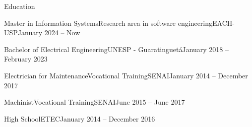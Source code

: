 \documentclass[]{template}
\begin{document}
\resumeheader
{}
{}
{}
{}
{}

\vspace*{1mm}

\begin{section}{Education}
 \begin{subsectionnobullet}{Master in Information Systems}{Research area in software engineering}{EACH-USP}{January 2024 -- Now}
 \end{subsectionnobullet}
 
 \begin{subsectionlist}{Bachelor of Electrical Engineering}{­}{UNESP - Guaratinguetá}{January 2018 -- February 2023}
 \end{subsectionlist}
 
 \begin{subsectionnobullet}{Electrician for Maintenance}{Vocational Training}{SENAI}{January 2014 -- December 2017}
 \end{subsectionnobullet}
 
 \begin{subsectionnobullet}{Machinist}{Vocational Training}{SENAI}{June 2015 -- June 2017}
 \end{subsectionnobullet}
 
 \begin{subsectionnobullet}{High School}{­}{ETEC}{January 2014 -- December 2016}
 \end{subsectionnobullet}
\end{section}
\end{document}
